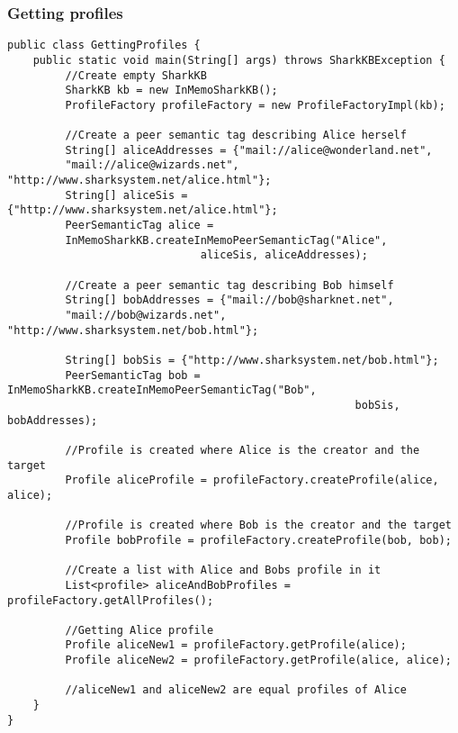 \documentclass[12pt]{article}
\begin{document}
\subsubsection{Getting profiles}
\begin{verbatim}
public class GettingProfiles {
    public static void main(String[] args) throws SharkKBException {
    	 //Create empty SharkKB
    	 SharkKB kb = new InMemoSharkKB();
    	 ProfileFactory profileFactory = new ProfileFactoryImpl(kb);
    	
    	 //Create a peer semantic tag describing Alice herself
    	 String[] aliceAddresses = {"mail://alice@wonderland.net",
    	 "mail://alice@wizards.net", "http://www.sharksystem.net/alice.html"};
    	 String[] aliceSis = {"http://www.sharksystem.net/alice.html"};
    	 PeerSemanticTag alice = 
    	 InMemoSharkKB.createInMemoPeerSemanticTag("Alice",
                              aliceSis, aliceAddresses);
    	
    	 //Create a peer semantic tag describing Bob himself
    	 String[] bobAddresses = {"mail://bob@sharknet.net",
    	 "mail://bob@wizards.net", "http://www.sharksystem.net/bob.html"};

    	 String[] bobSis = {"http://www.sharksystem.net/bob.html"};
    	 PeerSemanticTag bob = InMemoSharkKB.createInMemoPeerSemanticTag("Bob",
                                                      bobSis, bobAddresses);
    	
    	 //Profile is created where Alice is the creator and the target
    	 Profile aliceProfile = profileFactory.createProfile(alice, alice);
    	
    	 //Profile is created where Bob is the creator and the target
    	 Profile bobProfile = profileFactory.createProfile(bob, bob);
    	
    	 //Create a list with Alice and Bobs profile in it
    	 List<profile> aliceAndBobProfiles = profileFactory.getAllProfiles();  	
		
    	 //Getting Alice profile
    	 Profile aliceNew1 = profileFactory.getProfile(alice);
    	 Profile aliceNew2 = profileFactory.getProfile(alice, alice);
		
    	 //aliceNew1 and aliceNew2 are equal profiles of Alice
    }
}
\end{verbatim}
\end{document}
